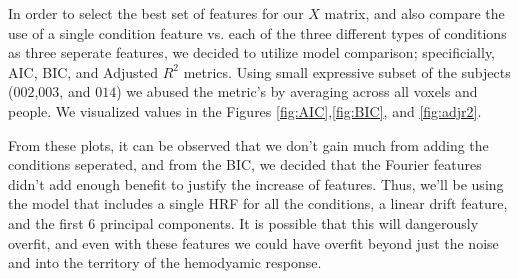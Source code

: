 \par In order to select the best set of features for our $X$ matrix, and also 
compare the use of a single condition feature vs. each of the three different 
types of conditions as three seperate features, we decided to utilize model 
comparison; specificially, AIC, BIC, and Adjusted $R^2$ metrics. Using small 
expressive subset of the subjects ($002$,$003$, and $014$) we abused the 
metric's by averaging across all voxels and people.  We visualized values in 
the Figures \ref{fig:AIC},\ref{fig:BIC}, and \ref{fig:adjr2}.

\par From these plots, it can be observed that we don't gain much from adding
the conditions seperated, and from the BIC, we decided that the Fourier
features didn't add enough benefit to justify the increase of features. Thus, 
we'll be using the model that includes a single HRF for all the conditions, 
a linear drift feature, and the first 6 principal components. It is possible 
that this will dangerously overfit, and even with these features we could have
overfit beyond just the noise and into the territory of the hemodyamic 
response.

%	
%


